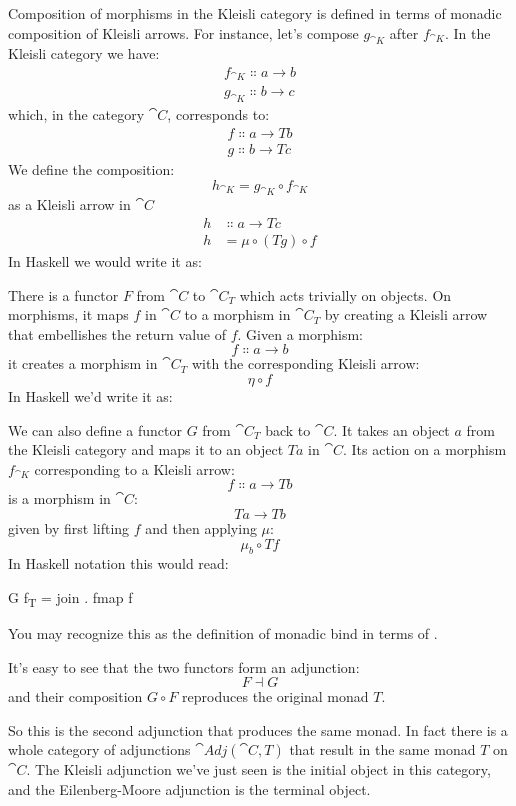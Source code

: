 Composition of morphisms in the Kleisli category is defined in terms of
monadic composition of Kleisli arrows. For instance, let's compose
$g_{\cat{K}}$ after $f_{\cat{K}}$. In the Kleisli category we have:
\begin{gather*}
	f_{\cat{K}} \Colon a \to b \\
	g_{\cat{K}} \Colon b \to c
\end{gather*}
which, in the category $\cat{C}$, corresponds to:
\begin{gather*}
	f \Colon a \to T b \\
	g \Colon b \to T c
\end{gather*}
We define the composition:
\[h_{\cat{K}} = g_{\cat{K}} \circ f_{\cat{K}}\]
as a Kleisli arrow in $\cat{C}$
\[
	\begin{aligned}
		h & \Colon a \to T c          \\
		h & = \mu \circ (T g) \circ f
	\end{aligned}
\]
In Haskell we would write it as:

There is a functor $F$ from $\cat{C}$ to $\cat{C}_T$
which acts trivially on objects. On morphisms, it maps $f$ in
$\cat{C}$ to a morphism in $\cat{C}_T$ by creating a
Kleisli arrow that embellishes the return value of $f$. Given a
morphism:
\[f \Colon a \to b\]
it creates a morphism in $\cat{C}_T$ with the
corresponding Kleisli arrow:
\[\eta \circ f\]
In Haskell we'd write it as:

We can also define a functor $G$ from $\cat{C}_T$
back to $\cat{C}$. It takes an object $a$ from the Kleisli
category and maps it to an object $T a$ in $\cat{C}$. Its action
on a morphism $f_{\cat{K}}$ corresponding to a Kleisli arrow:
\[f \Colon a \to T b\]
is a morphism in $\cat{C}$:
\[T a \to T b\]
given by first lifting $f$ and then applying $\mu$:
\[\mu_{b} \circ T f\]
In Haskell notation this would read:

\begin{snipv}
	G f\textsubscript{T} = join . fmap f
\end{snipv}
You may recognize this as the definition of monadic bind in terms of
.

It's easy to see that the two functors form an adjunction:
\[F \dashv G\]
and their composition $G \circ F$ reproduces the original monad $T$.

So this is the second adjunction that produces the same monad. In fact
there is a whole category of adjunctions $\cat{Adj}(\cat{C}, T)$ that result
in the same monad $T$ on $\cat{C}$. The Kleisli adjunction we've
just seen is the initial object in this category, and the
Eilenberg-Moore adjunction is the terminal object.

